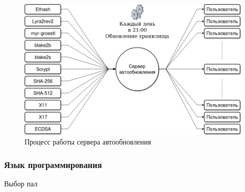\begin{figure}[h]
    \centering
    \includegraphics[width=\textwidth]{images/server}
    \caption{Процесс работы сервера автообновления}\label{update}
\end{figure}


\subsubsection{Язык программирования}
Выбор пал
